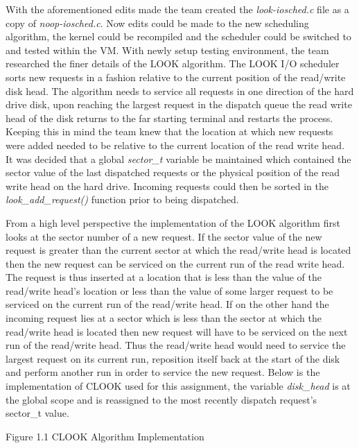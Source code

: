 \documentclass[10pt,onecolumn,draftclsnofoot]{IEEEtran} %
\begin{document}
\begin{singlespace}
        \normalfont \indent With the aforementioned edits made the team created the \textit{look-iosched.c} file as a copy of \textit{noop-iosched.c}. Now edits could be made to the new scheduling algorithm, the kernel could be recompiled and the scheduler could be switched to and tested within the VM. With newly setup testing environment, the team researched the finer details of the LOOK algorithm. The LOOK I/O scheduler sorts new requests in a fashion relative to the current position of the read/write disk head. The algorithm needs to service all requests in one direction of the hard drive disk, upon reaching the largest request in the dispatch queue the read write head of the disk returns to the far starting terminal and restarts the process. Keeping this in mind the team knew that the location at which new requests were added needed to be relative to the current location of the read write head. It was decided that a global \textit{sector\_t} variable be maintained which contained the sector value of the last dispatched requests or the physical position of the read write head on the hard drive. Incoming requests could then be sorted in the \textit{look\_add\_request()} function prior to being dispatched.

        \normalfont \indent From a high level perspective the implementation of the LOOK algorithm first looks at the sector number of a new request. If the sector value of the new request is greater than the current sector at which the read/write head is located then the new request can be serviced on the current run of the read write head. The request is thus inserted at a location that is less than the value of the read/write head's location or less than the value of some larger request to be serviced on the current run of the read/write head. If on the other hand the incoming request lies at a sector which is less than the sector at which the read/write head is located then new request will have to be serviced on the next run of the read/write head. Thus the read/write head would need to service the largest request on its current run, reposition itself back at the start of the disk and perform another run in order to service the new request. Below is the implementation of CLOOK used for this assignment, the variable \textit{disk\_head} is at the global scope and is reassigned to the most recently dispatch request's sector\_t value.

\newpage

\begin{center}
Figure 1.1 CLOOK Algorithm Implementation
\end{center}


\end{singlespace}
\end{document}
